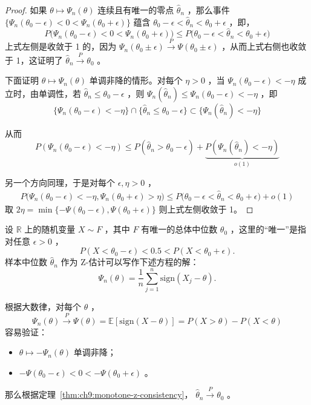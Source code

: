\begin{proof}

如果 $\theta\mapsto \Psi_n(\theta)$ 连续且有唯一的零点 $\widehat\theta_n$ ，那么事件 $\{\Psi_n(\theta_0-\epsilon)<0<\Psi_n(\theta_0+\epsilon)\}$ 蕴含 $\theta_0-\epsilon<\widehat\theta_n<\theta_0+\epsilon$ ，即， 
$$P\Big(\Psi_n(\theta_0-\epsilon)<0<\Psi_n(\theta_0+\epsilon)\Big)\le P\big(\theta_0-\epsilon<\widehat\theta_n<\theta_0+\epsilon\big)$$
上式左侧是收敛于 1 的，因为 $\Psi_n(\theta_0\pm\epsilon)\overset P\to\Psi(\theta_0\pm\epsilon)$ ，从而上式右侧也收敛于 1，这证明了 $\widehat\theta_n\overset P\to\theta_0$ 。

下面证明 $\theta\mapsto \Psi_n(\theta)$ 单调非降的情形。对每个 $\eta>0$ ，当 $\Psi_n(\theta_0-\epsilon)<-\eta$ 成立时，由单调性，若 $\widehat\theta_n\le\theta_0-\epsilon$ ，则 
$\Psi_n(\widehat\theta_n)\le\Psi_n(\theta_0-\epsilon)<-\eta$ ，即 
$$\{\Psi_n(\theta_0-\epsilon)<-\eta\}\cap \{\widehat\theta_n\le\theta_0-\epsilon\}\subset \{\Psi_n(\widehat\theta_n)<-\eta\}$$

从而 $$P(\Psi_n(\theta_0-\epsilon)<-\eta)\le P(\widehat\theta_n>\theta_0-\epsilon)+\underbrace{P(\Psi_n(\widehat\theta_n)<-\eta)}_{o(1)}$$

另一个方向同理，于是对每个 $\epsilon,\eta>0$ ，\[\begin{aligned} P\big(\Psi_n(\theta_0-\epsilon)<-\eta,\Psi_n(\theta_0+\epsilon)>\eta\big) \le P\big(\theta_0-\epsilon<\widehat\theta_n<\theta_0+\epsilon\big)+o(1) \end{aligned}\]
取 $2\eta=\min\{-\Psi(\theta_0-\epsilon),\Psi(\theta_0+\epsilon)\}$ 则上式左侧收敛于 1。

\end{proof}

\begin{example}[样本中位数的相合性]\label{ex:ch9:median-consistency}
设 $\mathbb R$ 上的随机变量 $X\sim F$ ，其中 $F$ 有唯一的总体中位数 $\theta_0$ ，这里的``唯一''是指对任意 $\epsilon>0$ ，
\[
P(X<\theta_0-\epsilon)<0.5<P(X<\theta_0+\epsilon).
\]
样本中位数 $\widehat\theta_n$ 作为 Z-估计可以写作下述方程的解：
\[
\Psi_n(\theta)=\frac1n\sum_{j=1}^n\mathrm{sign}(X_j-\theta).
\]

根据大数律，对每个 $\theta$ ， 
$$\Psi_n(\theta)\overset P\to \Psi(\theta)=\mathbb{E}[\mathrm{sign}(X-\theta)]=P(X>\theta)-P(X<\theta)$$
容易验证：

\begin{itemize}
\tightlist
\item
  $\theta\mapsto-\Psi_n(\theta)$ 单调非降；
\item
  $-\Psi(\theta_0-\epsilon)<0<-\Psi(\theta_0+\epsilon)$ 。
\end{itemize}
那么根据定理~\ref{thm:ch9:monotone-z-consistency}， $\widehat\theta_n\overset P\to \theta_0$ 。

\end{example}

